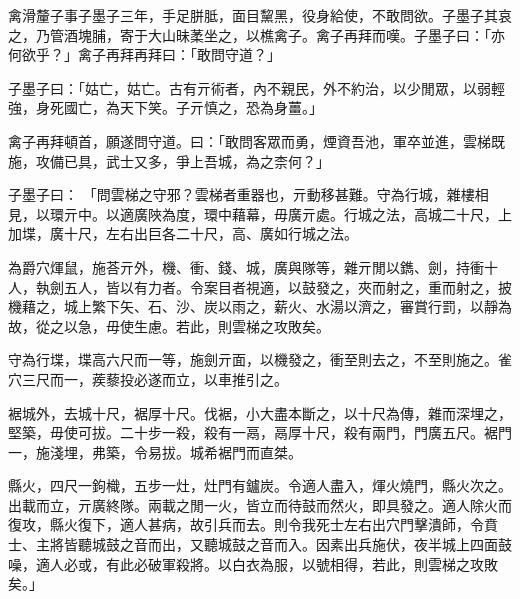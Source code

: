 
\begin{pinyinscope}
禽滑釐子事子墨子三年，手足胼胝，面目黧黑，役身給使，不敢問欲。子墨子其哀之，乃管酒塊脯，寄于大山昧葇坐之，以樵禽子。禽子再拜而嘆。子墨子曰：「亦何欲乎？」禽子再拜再拜曰：「敢問守道？」

子墨子曰：「姑亡，姑亡。古有亓術者，內不親民，外不約治，以少閒眾，以弱輕強，身死國亡，為天下笑。子亓慎之，恐為身薑。」

禽子再拜頓首，願遂問守道。曰：「敢問客眾而勇，煙資吾池，軍卒並進，雲梯既施，攻備已具，武士又多，爭上吾城，為之柰何？」

子墨子曰： 「問雲梯之守邪？雲梯者重器也，亓動移甚難。守為行城，雜樓相見，以環亓中。以適廣陜為度，環中藉幕，毋廣亓處。行城之法，高城二十尺，上加堞，廣十尺，左右出巨各二十尺，高、廣如行城之法。

為爵穴煇鼠，施荅亓外，機、衝、錢、城，廣與隊等，雜亓閒以鐫、劍，持衝十人，執劍五人，皆以有力者。令案目者視適，以鼓發之，夾而射之，重而射之，披機藉之，城上繁下矢、石、沙、炭以雨之，薪火、水湯以濟之，審賞行罰，以靜為故，從之以急，毋使生慮。若此，則雲梯之攻敗矣。

守為行堞，堞高六尺而一等，施劍亓面，以機發之，衝至則去之，不至則施之。雀穴三尺而一，蒺藜投必遂而立，以車推引之。

裾城外，去城十尺，裾厚十尺。伐裾，小大盡本斷之，以十尺為傳，雜而深埋之，堅築，毋使可拔。二十步一殺，殺有一鬲，鬲厚十尺，殺有兩門，門廣五尺。裾門一，施淺埋，弗築，令易拔。城希裾門而直桀。

縣火，四尺一鉤樴，五步一灶，灶門有鑪炭。令適人盡入，煇火燒門，縣火次之。出載而立，亓廣終隊。兩載之閒一火，皆立而待鼓而然火，即具發之。適人除火而復攻，縣火復下，適人甚病，故引兵而去。則令我死士左右出穴門擊潰師，令賁士、主將皆聽城鼓之音而出，又聽城鼓之音而入。因素出兵施伏，夜半城上四面鼓噪，適人必或，有此必破軍殺將。以白衣為服，以號相得，若此，則雲梯之攻敗矣。」


\end{pinyinscope}